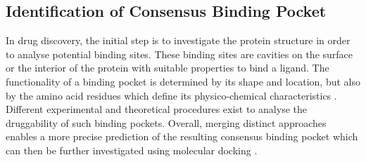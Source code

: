 \documentclass[11pt, letterpaper, titlepage]{article}
\renewcommand{\cite}{\parencite}
\begin{document}

\subsection{Identification of Consensus Binding Pocket}
In drug discovery, the initial step is to investigate the protein structure in order to analyse potential binding sites. These binding sites are cavities on the surface or the interior of the protein with suitable properties to bind a ligand. The functionality of a binding pocket is determined by its shape and location, but also by the amino acid residues which define its physico-chemical characteristics \cite{Stank_2016}. 
Different experimental and theoretical procedures exist to analyse the druggability of such binding pockets. Overall, merging distinct approaches enables a more precise prediction of the resulting consensus binding pocket which can then be further investigated using molecular docking \cite{Ricci_2022}. 
\end{document}
